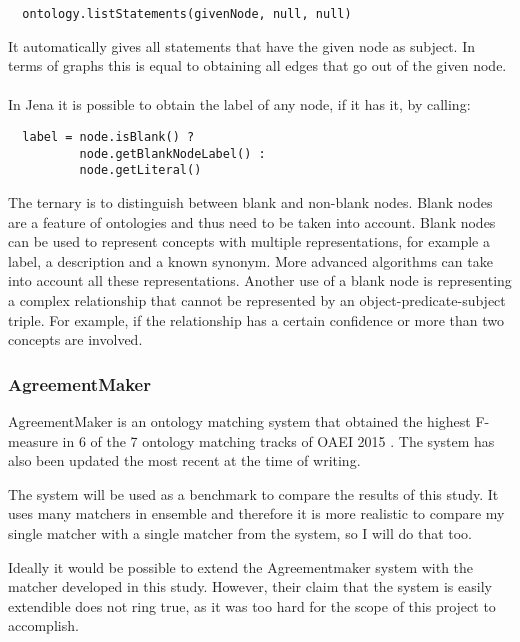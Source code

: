 \documentclass{article}
\begin{document}
 \lstset{language=Java}
 \begin{lstlisting}
  ontology.listStatements(givenNode, null, null)
 \end{lstlisting}
 
 It automatically gives all statements that have the given node as subject. In terms of graphs this is equal to obtaining all edges that go out of the given node.
 \paragraph{}
 In Jena it is possible to obtain the label of any node, if it has it, by calling:
 
 \lstset{language=Java}
 \begin{lstlisting}
  label = node.isBlank() ? 
  		  node.getBlankNodeLabel() : 
  		  node.getLiteral()
 \end{lstlisting}
 
 The ternary is to distinguish between blank and non-blank nodes. Blank nodes are a feature of ontologies and thus need to be taken into account. Blank nodes can be used to represent concepts with multiple representations, for example a label, a description and a known synonym. More advanced algorithms can take into account all these representations. Another use of a blank node is representing a complex relationship that cannot be represented by an object-predicate-subject triple. For example, if the relationship has a certain confidence or more than two concepts are involved.
 
 \subsubsection{AgreementMaker} \label{agreementmaker}
 AgreementMaker is an ontology matching system that obtained the highest F-measure in 6 of the 7 ontology matching tracks of OAEI 2015 \cite{oaei2015}. The system has also been updated the most recent at the time of writing\cite{agreementmaker}.
 
 The system will be used as a benchmark to compare the results of this study. It uses many matchers in ensemble and therefore it is more realistic to compare my single matcher with a single matcher from the system, so I will do that too. %
 
 Ideally it would be possible to extend the Agreementmaker system with the matcher developed in this study. However, their claim that the system is easily extendible does not ring true, as it was too hard for the scope of this project to accomplish. %
 
\end{document}
